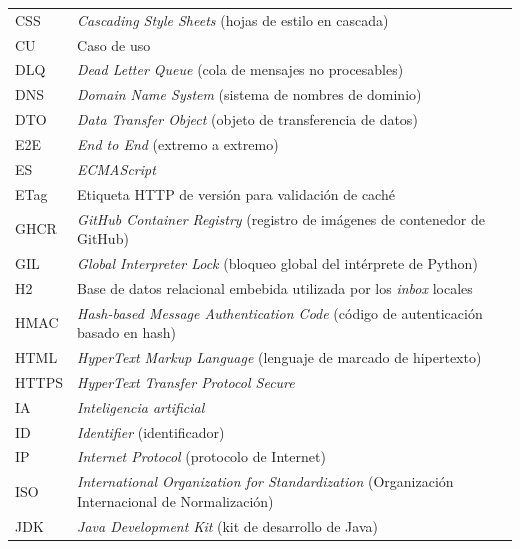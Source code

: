 \begin{longtable}{p{}p{}}
CSS &
\emph{Cascading Style Sheets} (hojas de estilo en cascada)\\

CU &
Caso de uso\\

DLQ &
\emph{Dead Letter Queue} (cola de mensajes no procesables)\\

DNS &
\emph{Domain Name System} (sistema de nombres de dominio)\\

DTO &
\emph{Data Transfer Object} (objeto de transferencia de datos)\\

E2E &
\emph{End to End} (extremo a extremo)\\

ES &
\emph{ECMAScript}\\

ETag &
Etiqueta HTTP de versión para validación de caché\\

GHCR &
\emph{GitHub Container Registry} (registro de imágenes de contenedor de GitHub)\\

GIL &
\emph{Global Interpreter Lock} (bloqueo global del intérprete de Python)\\

H2 &
Base de datos relacional embebida utilizada por los \emph{inbox} locales\\

HMAC &
\emph{Hash-based Message Authentication Code} (código de autenticación basado en hash)\\

HTML &
\emph{HyperText Markup Language} (lenguaje de marcado de hipertexto)\\

HTTPS &
\emph{HyperText Transfer Protocol Secure}\\

IA &
\emph{Inteligencia artificial}\\

ID &
\emph{Identifier} (identificador)\\

IP &
\emph{Internet Protocol} (protocolo de Internet)\\

ISO &
\emph{International Organization for Standardization} (Organización Internacional de Normalización)\\

JDK &
\emph{Java Development Kit} (kit de desarrollo de Java)\\


\end{longtable}
